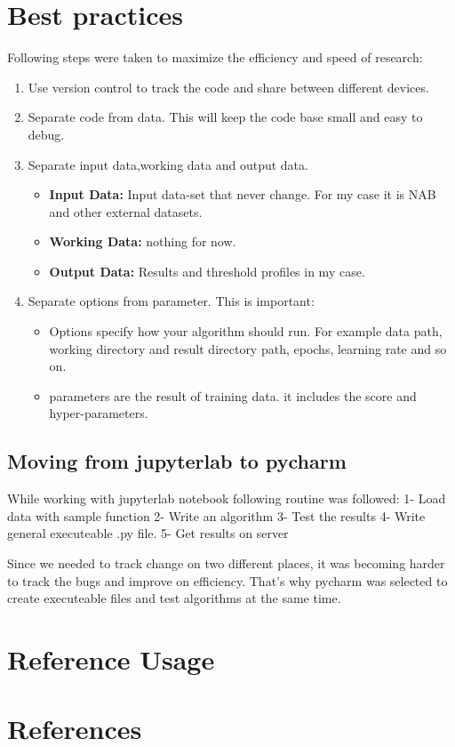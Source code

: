 \documentclass[12pt]{article}
\begin{document}
\section{Best practices}
Following steps were taken to maximize the efficiency and speed of research:
\begin{enumerate}
	\item Use version control to track the code and share between different devices.
	\item Separate code from data. This will keep the code base small and easy to debug.
	\item Separate input data,working data and output data.
	\begin{itemize}
		\item \textbf{Input Data:} Input data-set that never change. For my case it is NAB and other external datasets.
		\item \textbf{Working Data:} nothing for now.
		\item \textbf{Output Data:} Results and threshold profiles in my case. 
	\end{itemize}
	\item Separate options from parameter. This is important:
 	\begin{itemize}
 		\item Options specify how your algorithm should run. For example data path, working directory and result directory path, epochs, learning rate and so on.
 		\item parameters are the result of training data. it includes the score and hyper-parameters. 
 	\end{itemize}
	
\end{enumerate}

\subsection{Moving from jupyterlab to pycharm}
While working with jupyterlab notebook following routine was followed:
1- Load data with sample function
2- Write an algorithm
3- Test the results
4- Write general executeable .py file.
5- Get results on server

Since we needed to track change on two different places,
it was becoming harder to track the bugs and improve on efficiency.
That's why pycharm was selected to create executeable files and test
algorithms at the same time.
\section{Reference Usage}

\section{References}
\begingroup
\nocite{*}
\renewcommand{\section}[2]{}



\endgroup
\end{document}
